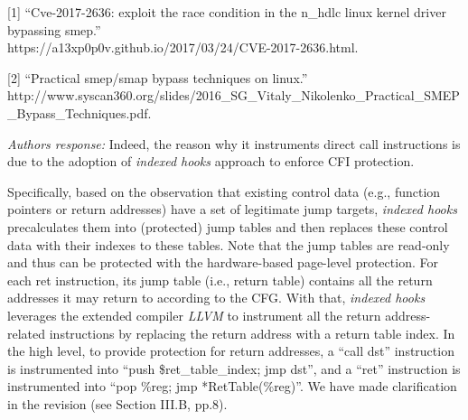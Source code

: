 \documentclass[oneside, 11pt]{article}
\begin{document}
[1] ``Cve-2017-2636: exploit the race condition in the n\_hdlc linux kernel driver bypassing smep.''\\
https://a13xp0p0v.github.io/2017/03/24/CVE-2017-2636.html.

[2] ``Practical smep/smap bypass techniques on linux.''\\
http://www.syscan360.org/slides/2016\_SG\_Vitaly\_Nikolenko\_Practical\_SMEP\_Bypass\_Techniques.pdf.





\smallskip
\smallskip
\smallskip
{}

{\em Authors response:}
Indeed, the reason why it instruments direct call instructions is due to
the adoption of \emph{indexed hooks} approach to enforce CFI protection.

Specifically, based on the observation that existing control data (e.g.,
function pointers or return addresses) have a set of legitimate jump targets,
\emph{indexed hooks} precalculates them into (protected) jump tables and then replaces
these control data with their indexes to these tables.
Note that the jump tables are read-only and thus can be protected with
the hardware-based page-level protection.
For each ret instruction, its jump table (i.e., return table) contains all the return
addresses it may return to according to the CFG. With that, \emph{indexed hooks} leverages
the extended compiler \emph{LLVM} to instrument all the return address-related instructions by replacing the
return address with a return table index. In the high level, to provide protection for
return addresses, a ``call dst'' instruction is instrumented into ``push \$ret\_table\_index; jmp dst'',
and a ``ret'' instruction is instrumented into ``pop \%reg; jmp *RetTable(\%reg)''.
We have made clarification in the revision (see Section III.B, pp.8).
\end{document}
